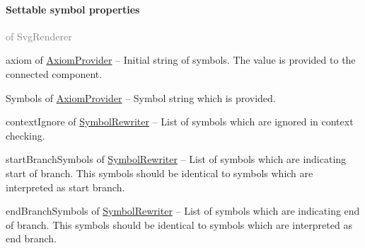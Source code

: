 	\paragraph{Settable symbol properties}\textcolor{gray}{of SvgRenderer}
	\begin{description*}
		\item[axiom] of \hyperref[Malsys.Processing.Components.Common.AxiomProvider]{AxiomProvider}
			-- Initial string of symbols.
            The value is provided to the connected component.
		\item[Symbols] of \hyperref[Malsys.Processing.Components.Common.AxiomProvider]{AxiomProvider}
			-- Symbol string which is provided.
		\item[contextIgnore] of \hyperref[Malsys.Processing.Components.Rewriters.SymbolRewriter]{SymbolRewriter}
			-- List of symbols which are ignored in context checking.
		\item[startBranchSymbols] of \hyperref[Malsys.Processing.Components.Rewriters.SymbolRewriter]{SymbolRewriter}
			-- List of symbols which are indicating start of branch.
            This symbols should be identical to symbols which are interpreted as start branch.
		\item[endBranchSymbols] of \hyperref[Malsys.Processing.Components.Rewriters.SymbolRewriter]{SymbolRewriter}
			-- List of symbols which are indicating end of branch.
            This symbols should be identical to symbols which are interpreted as end branch.
	\end{description*}
